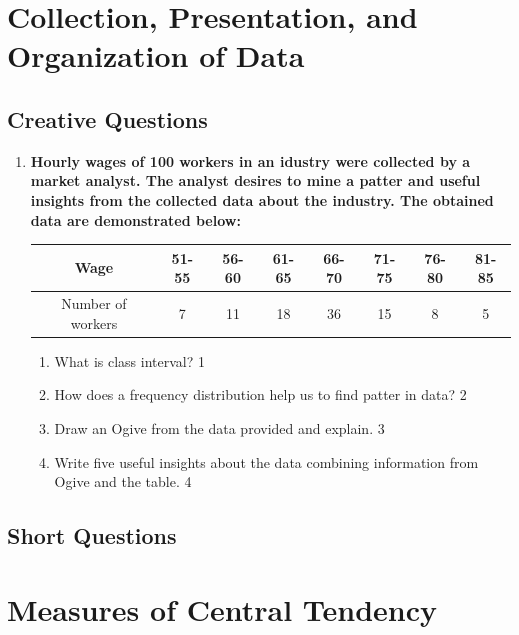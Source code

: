\documentclass[a4paper,oneside]{book}
\begin{document}
\chapter{Collection, Presentation, and Organization of Data} 

\section{Creative Questions}

    \begin{enumerate}
     \item
	  \textbf{Hourly wages of 100 workers in an idustry were collected by a market analyst. The analyst desires to mine a patter and useful insights from the collected data about the industry. The obtained data are demonstrated below:}
	  
	  \begin{table}[h]
	  \centering
\begin{tabular}{c|c|c|c|c|c|c|c}
Wage              & 51-55 & 56-60 & 61-65 & 66-70 & 71-75 & 76-80 & 81-85 \\ \hline
Number of workers & 7     & 11    & 18    & 36    & 15    & 8     & 5    
\end{tabular}
\end{table}

  \begin{enumerate}
    \item
	What is class interval? \hfill 1
    \item
	How does a frequency distribution help us to find patter in data? \hfill 2
    \item  
	Draw an Ogive from the data provided and explain. \hfill 3
    \item
	Write five useful insights about the data combining information from Ogive and the table. \hfill 4
  \end{enumerate}
  
    \end{enumerate}
    
\section{Short Questions}

\chapter{Measures of Central Tendency} 
\end{document}
